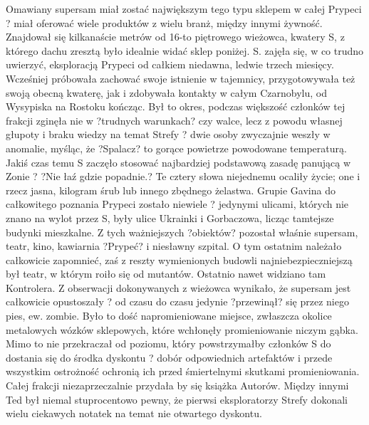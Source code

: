 \documentclass[../MAIN.tex]{subfiles}
\begin{document}
Omawiany supersam miał zostać największym tego typu sklepem w całej Prypeci ? miał oferować wiele produktów z wielu branż, między innymi żywność. Znajdował się kilkanaście metrów od 16-to piętrowego wieżowca, kwatery S, z którego dachu zresztą było idealnie widać sklep poniżej.
S. zajęła się, w co trudno uwierzyć, eksploracją Prypeci od całkiem niedawna, ledwie trzech miesięcy. Wcześniej próbowała zachować swoje istnienie w tajemnicy, przygotowywała też swoją obecną kwaterę, jak i zdobywała kontakty w całym Czarnobylu, od Wysypiska na Rostoku kończąc. Był to okres, podczas większość członków tej frakcji zginęła nie w ?trudnych warunkach? czy walce, lecz z powodu własnej głupoty i braku wiedzy na temat Strefy ? dwie osoby zwyczajnie weszły w anomalie, myśląc, że ?Spalacz? to gorące powietrze powodowane temperaturą.
Jakiś czas temu S zaczęło stosować najbardziej podstawową zasadę panującą w Zonie ? ?Nie łaź gdzie popadnie.? Te cztery słowa niejednemu ocaliły życie; one i rzecz jasna, kilogram śrub lub innego zbędnego żelastwa.
Grupie Gavina do całkowitego poznania Prypeci zostało niewiele ? jedynymi ulicami, których nie znano na wylot przez S, były ulice Ukrainki i Gorbaczowa, licząc tamtejsze budynki mieszkalne. Z tych ważniejszych ?obiektów? pozostał właśnie supersam, teatr, kino, kawiarnia ?Prypeć? i niesławny szpital. O tym ostatnim należało całkowicie zapomnieć, zaś z reszty wymienionych budowli najniebezpieczniejszą był teatr, w którym roiło się od mutantów.
Ostatnio nawet widziano tam Kontrolera.
Z obserwacji dokonywanych z wieżowca wynikało, że supersam jest całkowicie opustoszały ? od czasu do czasu jedynie ?przewinął? się przez niego pies, ew. zombie. Było to dość napromieniowane miejsce, zwłaszcza okolice metalowych wózków sklepowych, które wchłonęły promieniowanie niczym gąbka. Mimo to nie przekraczał od poziomu, który powstrzymałby członków S do dostania się do środka dyskontu ? dobór odpowiednich artefaktów i przede wszystkim ostrożność ochronią ich przed śmiertelnymi skutkami promieniowania.
Całej frakcji niezaprzeczalnie przydała by się książka Autorów. Między innymi Ted był niemal stuprocentowo pewny, że pierwsi eksploratorzy Strefy dokonali wielu ciekawych notatek na temat nie otwartego dyskontu.
\end{document}
